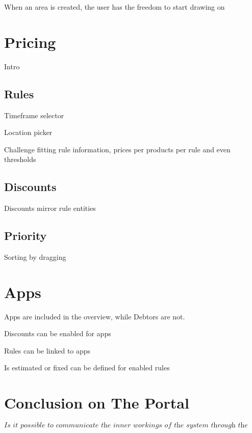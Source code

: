 When an area is created, the user has the freedom to start drawing on

\section{Pricing}
Intro

\subsection{Rules}
Timeframe selector

Location picker

Challenge fitting rule information, prices per products per rule and even thresholds

\subsection{Discounts}
Discounts mirror rule entities

\subsection{Priority}
Sorting by dragging

\section{Apps}
Apps are included in the overview, while Debtors are not.

Discounts can be enabled for apps

Rules can be linked to apps

Is estimated or fixed can be defined for enabled rules

\section{Conclusion on The Portal}
\[\textit{Is it possible to communicate the inner workings of the system through the user interface?}\]\hfill

